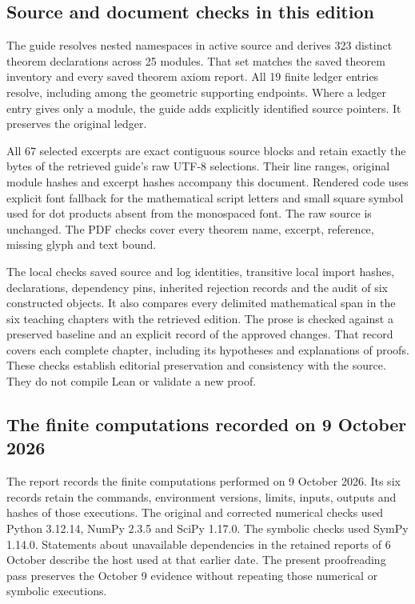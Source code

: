 \subsection{Source and document checks in this edition}
The guide resolves nested namespaces in active source and derives 323 distinct theorem declarations across 25 modules. That set matches the saved theorem inventory and every saved theorem axiom report. All 19 finite ledger entries resolve, including  among the geometric supporting endpoints. Where a ledger entry gives only a module, the guide adds explicitly identified source pointers. It preserves the original ledger.

All 67 selected excerpts are exact contiguous source blocks and retain exactly the bytes of the retrieved guide's raw UTF-8 selections. Their line ranges, original module hashes and excerpt hashes accompany this document. Rendered code uses explicit font fallback for the mathematical script letters and small square symbol used for dot products absent from the monospaced font. The raw source is unchanged. The PDF checks cover every theorem name, excerpt, reference, missing glyph and text bound.

The local  checks saved source and log identities, transitive local import hashes, declarations, dependency pins, inherited rejection records and the audit of six constructed objects. It also compares every delimited mathematical span in the six teaching chapters with the retrieved edition. The prose is checked against a preserved baseline and an explicit record of the approved changes. That record covers each complete chapter, including its hypotheses and explanations of proofs. These checks establish editorial preservation and consistency with the source. They do not compile Lean or validate a new proof.

\subsection{The finite computations recorded on 9 October 2026}
The report  records the finite computations performed on 9 October 2026. Its six records retain the commands, environment versions, limits, inputs, outputs and hashes of those executions. The original and corrected numerical checks used Python 3.12.14, NumPy 2.3.5 and SciPy 1.17.0. The symbolic checks used SymPy 1.14.0. Statements about unavailable dependencies in the retained reports of 6 October describe the host used at that earlier date. The present proofreading pass preserves the October 9 evidence without repeating those numerical or symbolic executions.

